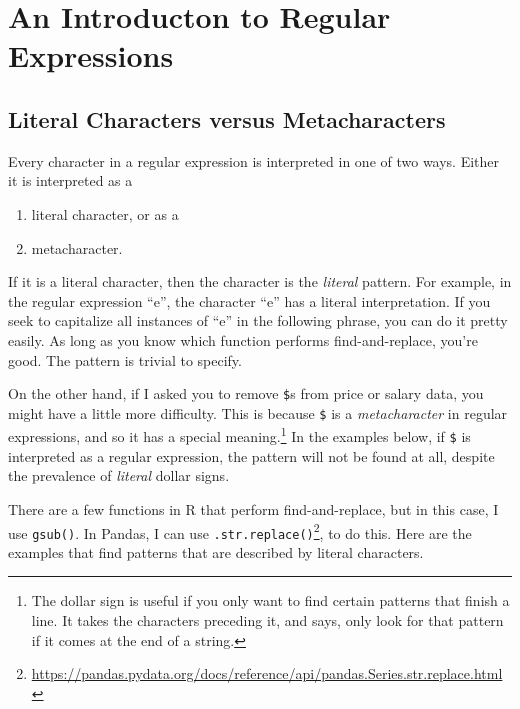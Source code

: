 \documentclass[
  12pt,
  krantz2]{krantz}
\providecommand{\tightlist}{%
  \setlength{\itemsep}{0pt}\setlength{\parskip}{0pt}}
\renewcommand{\href}[2]{#2\footnote{\url{#1}}}
\begin{document}
\hypertarget{an-introducton-to-regular-expressions}{%
\section{An Introducton to Regular Expressions}\label{an-introducton-to-regular-expressions}}

\hypertarget{literal-characters-versus-metacharacters}{%
\subsection{Literal Characters versus Metacharacters}\label{literal-characters-versus-metacharacters}}

Every character in a regular expression is interpreted in one of two ways. Either it is interpreted as a

\begin{enumerate}
\def\labelenumi{\arabic{enumi}.}
\tightlist
\item
  literal character, or as a
\item
  metacharacter.
\end{enumerate}

If it is a literal character, then the character is the \emph{literal} pattern. For example, in the regular expression ``e'', the character ``e'' has a literal interpretation. If you seek to capitalize all instances of ``e'' in the following phrase, you can do it pretty easily. As long as you know which function performs find-and-replace, you're good. The pattern is trivial to specify.

On the other hand, if I asked you to remove \texttt{\$}s from price or salary data, you might have a little more difficulty. This is because \texttt{\$} is a \emph{metacharacter} in regular expressions, and so it has a special meaning.\footnote{The dollar sign is useful if you only want to find certain patterns that finish a line. It takes the characters preceding it, and says, only look for that pattern if it comes at the end of a string.} In the examples below, if \texttt{\$} is interpreted as a regular expression, the pattern will not be found at all, despite the prevalence of \emph{literal} dollar signs.

There are a few functions in R that perform find-and-replace, but in this case, I use \texttt{gsub()}. In Pandas, I can use \href{https://pandas.pydata.org/docs/reference/api/pandas.Series.str.replace.html}{\texttt{.str.replace()}}, to do this. Here are the examples that find patterns that are described by literal characters.
\end{document}
